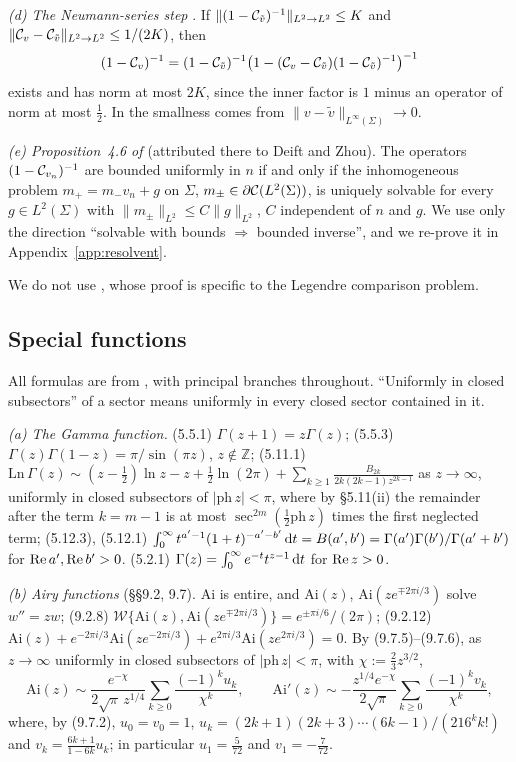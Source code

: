 \emph{(d) The Neumann-series step} \cite[proof of Theorem~4.7, (4.12)--(4.13)]{CD}. If
$\|(1-\mathcal{C}_{\tilde v})^{-1}\|_{L^2\to L^2}\le K$ and $\|\mathcal{C}_v-\mathcal{C}_{\tilde v}\|_{L^2\to L^2}\le1/(2K)$, then
\[
  (1-\mathcal{C}_v)^{-1}=(1-\mathcal{C}_{\tilde v})^{-1}\bigl(1-(\mathcal{C}_v-\mathcal{C}_{\tilde v})(1-\mathcal{C}_{\tilde v})^{-1}\bigr)^{-1}
\]
exists and has norm at most $2K$, since the inner factor is $1$ minus an operator of norm at most $\frac12$. In
\cite{CD} the smallness comes from $\|v-\tilde v\|_{L^\infty(\Sigma)}\to0$.

\emph{(e) Proposition~4.6 of \cite{CD}} (attributed there to Deift and Zhou). The operators $(1-\mathcal{C}_{v_n})^{-1}$
are bounded uniformly in $n$ if and only if the inhomogeneous problem $m_+=m_-v_n+g$ on $\Sigma$,
$m_\pm\in\partial\mathcal{C}(L^2(\Sigma))$, is uniquely solvable for every $g\in L^2(\Sigma)$ with $\|m_\pm\|_{L^2}\le C\|g\|_{L^2}$, $C$
independent of $n$ and $g$. We use only the direction ``solvable with bounds $\Rightarrow$ bounded inverse'', and we
re-prove it in Appendix~\ref{app:resolvent}.

We do not use \cite[Theorem~4.5]{CD}, whose proof is specific to the Legendre comparison problem.

\subsection{Special functions}\label{sec:tool-dlmf}

All formulas are from \cite{DLMF}, with principal branches throughout. ``Uniformly in closed subsectors'' of a sector
means uniformly in every closed sector contained in it.

\emph{(a) The Gamma function.} (5.5.1) $\Gamma(z+1)=z\Gamma(z)$; (5.5.3) $\Gamma(z)\Gamma(1-z)=\pi/\sin(\pi z)$,
$z\notin\mathbb Z$; (5.11.1) $\mathrm{Ln}\,\Gamma(z)\sim(z-\frac12)\ln z-z+\frac12\ln(2\pi)+\sum_{k\ge1}
\frac{B_{2k}}{2k(2k-1)z^{2k-1}}$ as $z\to\infty$, uniformly in closed subsectors of $|\mathrm{ph}\,z|<\pi$, where by
\S5.11(ii) the remainder after the term $k=m-1$ is at most $\sec^{2m}(\frac12\mathrm{ph}\,z)$ times the first neglected
term; (5.12.3), (5.12.1) $\int_0^\infty t^{a'-1}(1+t)^{-a'-b'}\,\mathrm{d} t=B(a',b')=\Gamma(a')\Gamma(b')/\Gamma(a'+b')$ for
$\operatorname{Re} a',\operatorname{Re} b'>0$. (5.2.1) $\Gamma(z)=\int_0^\infty e^{-t}t^{z-1}\,\mathrm{d} t$ for $\operatorname{Re} z>0$.

\emph{(b) Airy functions} (\S\S9.2, 9.7). $\mathrm{Ai}$ is entire, and $\mathrm{Ai}(z)$, $\mathrm{Ai}(ze^{\mp2\pi
i/3})$ solve $w''=zw$; (9.2.8) $\mathcal W\{\mathrm{Ai}(z),\mathrm{Ai}(ze^{\mp2\pi i/3})\}=e^{\pm\pi i/6}/(2\pi)$;
(9.2.12) $\mathrm{Ai}(z)+e^{-2\pi i/3}\mathrm{Ai}(ze^{-2\pi i/3})+e^{2\pi i/3}\mathrm{Ai}(ze^{2\pi i/3})=0$. By
(9.7.5)--(9.7.6), as $z\to\infty$ uniformly in closed subsectors of $|\mathrm{ph}\,z|<\pi$, with
$\chi:=\frac23z^{3/2}$,
\[
  \mathrm{Ai}(z)\sim\frac{e^{-\chi}}{2\sqrt\pi\,z^{1/4}}\sum_{k\ge0}\frac{(-1)^ku_k}{\chi^k},\qquad
  \mathrm{Ai}'(z)\sim-\frac{z^{1/4}e^{-\chi}}{2\sqrt\pi}\sum_{k\ge0}\frac{(-1)^kv_k}{\chi^k},
\]
where, by (9.7.2), $u_0=v_0=1$, $u_k=(2k+1)(2k+3)\cdots(6k-1)/(216^kk!)$ and $v_k=\frac{6k+1}{1-6k}u_k$; in
particular $u_1=\frac5{72}$ and $v_1=-\frac7{72}$.

